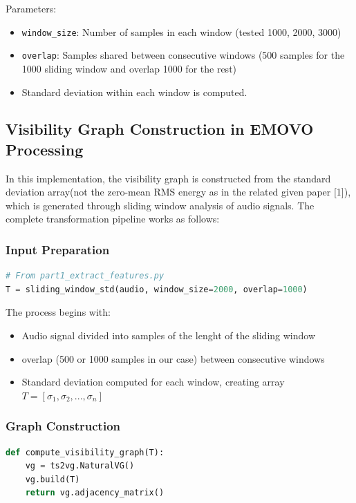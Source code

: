 \documentclass[12pt]{ieeetj}
\begin{document}
Parameters:
\begin{itemize}
    \item \texttt{window\_size}: Number of samples in each window (tested 1000, 2000, 3000)
    \item \texttt{overlap}: Samples shared between consecutive windows (500 samples for the 1000 sliding window and overlap 1000 for the rest)
    \item Standard deviation within each window is computed.
\end{itemize}



\subsection{Visibility Graph Construction in EMOVO Processing}
In this implementation, the visibility graph is constructed from the standard deviation array(not the zero-mean RMS energy as in the related given paper [1]), 
which is generated through sliding window analysis of audio signals. 
The complete transformation pipeline works as follows:

\subsubsection{Input Preparation}
\begin{lstlisting}[language=Python]
# From part1_extract_features.py
T = sliding_window_std(audio, window_size=2000, overlap=1000)
\end{lstlisting}

The process begins with:
\begin{itemize}
    \item Audio signal divided into samples of the lenght of the sliding window
    \item overlap (500 or 1000 samples in our case) between consecutive windows
    \item Standard deviation computed for each window, creating array $T = [\sigma_1, \sigma_2, ..., \sigma_n]$
\end{itemize}

\subsubsection{Graph Construction}
\begin{lstlisting}[language=Python]
def compute_visibility_graph(T):
    vg = ts2vg.NaturalVG()
    vg.build(T)
    return vg.adjacency_matrix()
\end{lstlisting}
\end{document}
